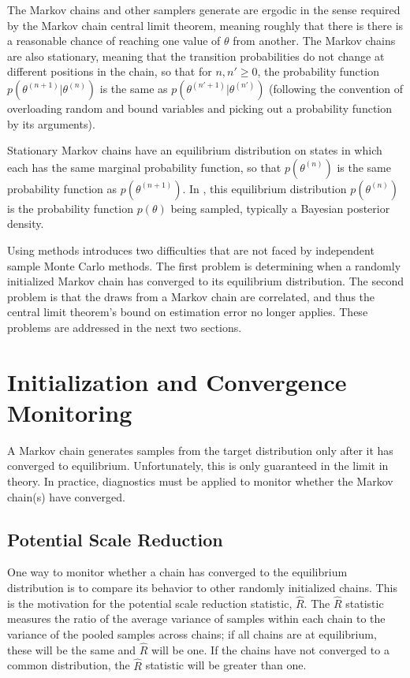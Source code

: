 The Markov chains \Stan and other \MCMC samplers generate are ergodic
in the sense required by the Markov chain central limit theorem,
meaning roughly that there is there is a reasonable chance of reaching
one value of $\theta$ from another.  The Markov chains are also
stationary, meaning that the transition probabilities do not change at
different positions in the chain, so that for $n, n' \geq 0$, the
probability function $p(\theta^{(n+1)}|\theta^{(n)})$ is the same as
$p(\theta^{(n'+1)}|\theta^{(n')})$ (following the convention of
overloading random and bound variables and picking out a probability
function by its arguments).

Stationary Markov chains have an equilibrium distribution on states in
which each has the same marginal probability function, so that
$p(\theta^{(n)})$ is the same probability function as
$p(\theta^{(n+1)})$.  In \Stan, this equilibrium distribution
$p(\theta^{(n)})$ is the probability function $p(\theta)$ being
sampled, typically a Bayesian posterior density.

Using \MCMC methods introduces two difficulties that are not faced by
independent sample Monte Carlo methods.  The first problem is determining
when a randomly initialized Markov chain has converged to its
equilibrium distribution.  The second problem is that the draws from a
Markov chain are correlated, and thus the central limit theorem's
bound on estimation error no longer applies.  These problems are
addressed in the next two sections.


\section{Initialization and Convergence Monitoring}

A Markov chain generates samples from the target distribution only
after it has converged to equilibrium.  Unfortunately, this is only
guaranteed in the limit in theory.  In practice, diagnostics must be
applied to monitor whether the Markov chain(s) have converged.

\subsection{Potential Scale Reduction}

One way to monitor whether a chain has converged to the equilibrium
distribution is to compare its behavior to other randomly initialized
chains.  This is the motivation for the \cite{GelmanRubin:1992}
potential scale reduction statistic, $\hat{R}$.  The $\hat{R}$
statistic measures the ratio of the average variance of samples within
each chain to the variance of the pooled samples across chains; if all
chains are at equilibrium, these will be the same and $\hat{R}$ will
be one.  If the chains have not converged to a common distribution,
the $\hat{R}$ statistic will be greater than one.

